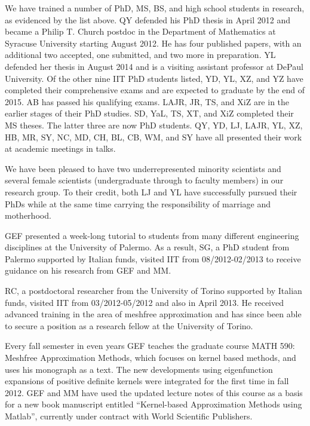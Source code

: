 \documentclass[11pt]{NSFamsart}
\newcommand{\Matlab}{{\sc Matlab}\xspace}
\begin{document}
We have trained a number of PhD, MS, BS, and high school students in research, as evidenced by the list above.  QY defended his PhD thesis in April 2012 and became a Philip T. Church postdoc in the Department of Mathematics at Syracuse University starting August 2012. He has four published papers, with an additional two accepted, one submitted, and two more in preparation.  YL defended her thesis in August 2014 and is a visiting assistant professor at DePaul University.  Of the other nine IIT PhD students listed, YD, YL, XZ, and YZ have completed their comprehensive exams and are expected to graduate by the end of 2015.  AB has passed his qualifying exams.  LAJR, JR, TS, and XiZ are in the earlier stages of their PhD studies. SD, YaL, TS, XT, and XiZ completed their MS theses. The latter three are now PhD students.  QY, YD, LJ, LAJR, YL, XZ, HB, MR, SY, NC, MD, CH, BL, CB, WM, and SY have all presented their work at academic meetings in talks.

We have been pleased to have two underrepresented minority scientists and several female scientists (undergraduate through to faculty members) in our research group.  To their credit, both LJ and YL have successfully pursued their PhDs while at the same time carrying the responsibility of marriage and motherhood.

GEF presented a week-long tutorial to students from many different engineering disciplines at the University of Palermo. As a result, SG, a PhD student from Palermo supported by Italian funds, visited IIT from 08/2012-02/2013 to receive guidance on his research from GEF and MM.

RC, a postdoctoral researcher from the University of Torino supported by Italian funds, visited IIT from 03/2012-05/2012 and also in April 2013. He received advanced training in the area of meshfree approximation and has since been able to secure a position as a research fellow at the University of Torino.

Every fall semester in even years GEF teaches the graduate course MATH 590: Meshfree Approximation Methods, which focuses on kernel based methods, and uses his monograph \citep{Fas07a} as a text. The new developments using eigenfunction expansions of positive definite kernels were integrated for the first time in fall 2012. GEF and MM have used the updated lecture notes of this course as a basis for a new book manuscript entitled ``Kernel-based Approximation Methods using \Matlab'', currently under contract with World Scientific Publishers.
\end{document}
